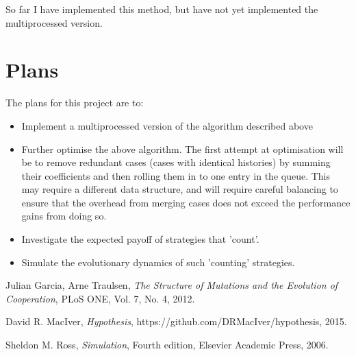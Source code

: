 \documentclass[a4paper,11pt]{article}
\begin{document}
So far I have implemented this method, but have not yet implemented the multiprocessed version.

\section*{Plans}

The plans for this project are to:
\begin{itemize}

    \item Implement a multiprocessed version of the algorithm described above
    \item Further optimise the above algorithm. The first attempt at optimisation will be to remove redundant cases (cases with identical histories) by summing their coefficients and then rolling them in to one entry in the queue. This may require a different data structure, and will require careful balancing to ensure that the overhead from merging cases does not exceed the performance gains from doing so.
    \item Investigate the expected payoff of strategies that 'count'.
    \item Simulate the evolutionary dynamics of such 'counting' strategies.

\end{itemize}

\begin{thebibliography}{9}

        Julian Garcia, Arne Traulsen,
        \emph{The Structure of Mutations and the Evolution of Cooperation},
        PLoS ONE,
        Vol. 7,
        No. 4,
        2012.

        David R. MacIver,
        \emph{Hypothesis},
        https://github.com/DRMacIver/hypothesis,
        2015.

        Sheldon M. Ross,
        \emph{Simulation},
        Fourth edition,
        Elsevier Academic Press,
        2006.

\end{thebibliography}
\end{document}

